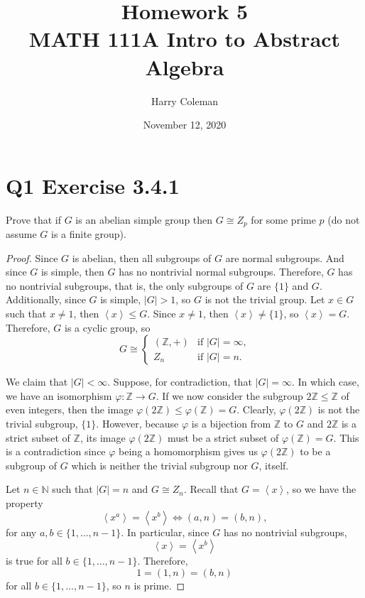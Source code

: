 \documentclass[12pt]{article}
\newenvironment{problem}
    {\begin{lrbox}{\mybox}\begin{minipage}{0.98\textwidth}}
    {\end{minipage}\end{lrbox}\framebox[\textwidth]{\usebox{\mybox}}}
\let\phi\varphi %
\newcommand{\N}{\mathbb{N}} %
\newcommand{\Z}{\mathbb{Z}} %
\newcommand{\<}{\left\langle} %
\renewcommand{\>}{\right\rangle} %
\let\iso\cong %
\begin{document}
 
\title{Homework 5\\
    \large MATH 111A Intro to Abstract Algebra
}
\author{Harry Coleman}
\date{November 12, 2020}
\maketitle

\section*{Q1 Exercise 3.4.1}
\begin{problem}
    Prove that if $G$ is an abelian simple group then $G \cong Z_p$ for some prime $p$ (do not assume $G$ is a finite group).
\end{problem}

\begin{proof}
    Since $G$ is abelian, then all subgroups of $G$ are normal subgroups. And since $G$ is simple, then $G$ has no nontrivial normal subgroups. Therefore, $G$ has no nontrivial subgroups, that is, the only subgroups of $G$ are $\{1\}$ and $G$. Additionally, since $G$ is simple, $|G|>1$, so $G$ is not the trivial group. Let $x\in G$ such that $x\ne 1$, then $\<x\>\leq G$. Since $x\ne1$, then $\<x\>\ne\{1\}$, so $\<x\>=G$. Therefore, $G$ is a cyclic group, so
    \[G \iso \begin{cases}
        (\Z, +) &\text{if $|G|=\infty$,} \\
        Z_n &\text{if $|G|=n$.}
    \end{cases}\]
    
    We claim that $|G|<\infty$. Suppose, for contradiction, that $|G|=\infty$. In which case, we have an isomorphism $\phi:\Z\to G$. If we now consider the subgroup $2\Z\leq\Z$ of even integers, then the image $\phi(2\Z) \leq \phi(\Z) = G$. Clearly, $\phi(2\Z)$ is not the trivial subgroup, $\{1\}$. However, because $\phi$ is a bijection from $\Z$ to $G$ and $2\Z$ is a strict subset of $\Z$, its image $\phi(2\Z)$ must be a strict subset of $\phi(\Z)=G$. This is a contradiction since $\phi$ being a homomorphism gives us $\phi(2\Z)$ to be a subgroup of $G$ which is neither the trivial subgroup nor $G$, itself.
    
    Let $n\in\N$ such that $|G|=n$ and $G\iso Z_n$. Recall that $G=\<x\>$, so we have the property
    \[\<x^a\> = \<x^b\> \iff (a,n) = (b,n),\]
    for any $a,b\in\{1,\dots,n-1\}$. In particular, since $G$ has no nontrivial subgroups,
    \[\<x\> = \<x^b\>\]
    is true for all $b\in\{1,\dots,n-1\}$. Therefore,
    \[1 = (1,n) = (b,n)\]
    for all $b\in\{1,\dots,n-1\}$, so $n$ is prime. 
        
\end{proof}
\end{document}
